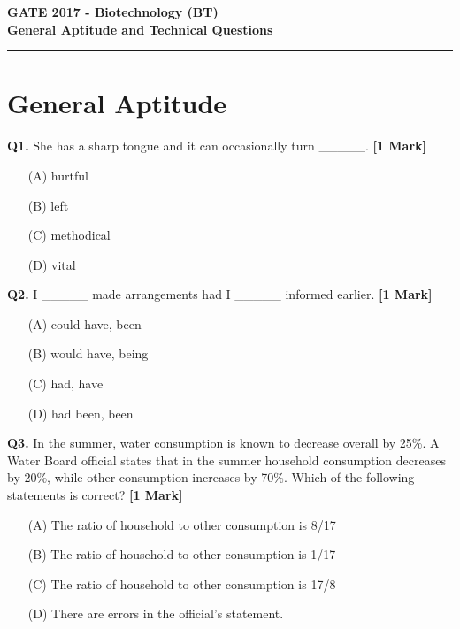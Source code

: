 \documentclass[11pt]{article}
\newcommand{\questiona}[2]{
    \noindent\textbf{Q#2.} #1 \hfill \textbf{[1 Mark]}
}
\begin{document}
\begin{center}
    \Large\textbf{GATE 2017 - Biotechnology (BT)} \\
    \large\textbf{General Aptitude and Technical Questions} \\
    \rule{\textwidth}{0.5pt} %
\end{center}

\vspace{0.5cm}

\section*{General Aptitude}

\questiona{She has a sharp tongue and it can occasionally turn \_\_\_\_\_.}{1}
\begin{enumerate}
    \item[(A)] hurtful
    \item[(B)] left  
    \item[(C)] methodical
    \item[(D)] vital
\end{enumerate}

\vspace{0.5cm}

\questiona{I \_\_\_\_\_ made arrangements had I \_\_\_\_\_ informed earlier.}{2}
\begin{enumerate}
    \item[(A)] could have, been
    \item[(B)] would have, being  
    \item[(C)] had, have
    \item[(D)] had been, been
\end{enumerate}

\vspace{0.5cm}

\questiona{In the summer, water consumption is known to decrease overall by 25\%. A Water Board official states that in the summer household consumption decreases by 20\%, while other consumption increases by 70\%. Which of the following statements is correct?}{3}
\begin{enumerate}
    \item[(A)] The ratio of household to other consumption is 8/17
    \item[(B)] The ratio of household to other consumption is 1/17  
    \item[(C)] The ratio of household to other consumption is 17/8
    \item[(D)] There are errors in the official's statement.
\end{enumerate}
\end{document}
